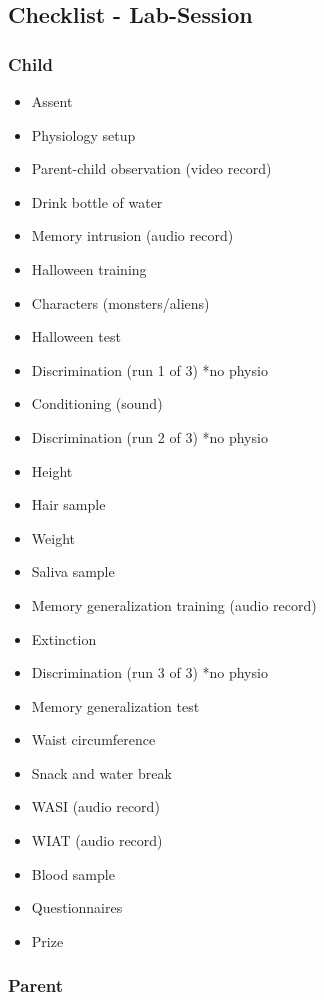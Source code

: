 \documentclass[]{book}
\providecommand{\tightlist}{%
  \setlength{\itemsep}{0pt}\setlength{\parskip}{0pt}}
\begin{document}
\hypertarget{checklist---lab-session}{%
\subsection{Checklist - Lab-Session}\label{checklist---lab-session}}

\hypertarget{child-1}{%
\subsubsection{Child}\label{child-1}}

\begin{itemize}
\tightlist
\item
  Assent
\item
  Physiology setup
\item
  Parent-child observation (video record)
\item
  Drink bottle of water
\item
  Memory intrusion (audio record)
\item
  Halloween training
\item
  Characters (monsters/aliens)
\item
  Halloween test
\item
  Discrimination (run 1 of 3) *no physio
\item
  Conditioning (sound)
\item
  Discrimination (run 2 of 3) *no physio
\item
  Height
\item
  Hair sample
\item
  Weight
\item
  Saliva sample
\item
  Memory generalization training (audio record)
\item
  Extinction
\item
  Discrimination (run 3 of 3) *no physio
\item
  Memory generalization test
\item
  Waist circumference
\item
  Snack and water break
\item
  WASI (audio record)
\item
  WIAT (audio record)
\item
  Blood sample
\item
  Questionnaires
\item
  Prize
\end{itemize}

\hypertarget{parent-1}{%
\subsubsection{Parent}\label{parent-1}}
\end{document}

